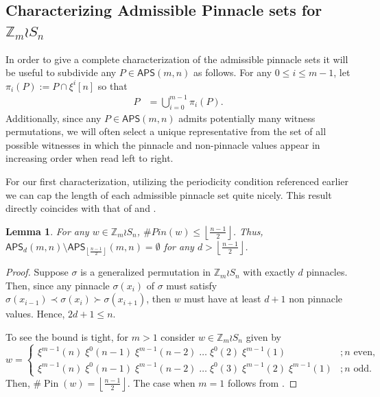 \documentclass[12pt,reqno]{amsart}
\numberwithin{equation}{section}
\theoremstyle{plain}
\newtheorem{lemma}[theorem]{Lemma}
\theoremstyle{definition}
\theoremstyle{remark}
\newcommand{\Z}{\mathbb{Z}}
\newcommand{\Pin}{\operatorname{Pin}}
\newcommand\APS{\mathsf{APS}}
\newcommand{\floor}[1]{\left\lfloor#1\right\rfloor}
\begin{document}
\subsection{Characterizing Admissible Pinnacle sets for $\Z_m\wr S_n$} \label{subsec:characterization}
In order to give a complete characterization of the admissible pinnacle sets it will be useful to subdivide any $P \in \APS(m,n)$ as follows. 
For any $0\leq i \leq m-1$, let $\pi_i(P) := P \cap \xi^i[n]$ so that 
\begin{align}
    P &=\bigcup_{i=0}^{m-1}\pi_i(P).
\end{align}
Additionally, since any $P \in \APS(m,n)$ admits potentially many witness permutations, we will often select a unique representative from the set of all possible witnesses in which the pinnacle and non-pinnacle values appear in increasing order when read left to right. 

\par For our first characterization, utilizing the periodicity condition referenced earlier we can cap the length of each admissible pinnacle set quite nicely. This result directly coincides with that of \cite{PinSignedPermutations} and \cite{PinnaclesTypeA}.


\begin{lemma} \label{lem:maxLength}
    For any $w \in \Z_m\wr S_n$, $\#Pin(w) \leq \floor{\frac{n-1}{2}}$. Thus, $\APS_d(m, n) \setminus \APS_{\floor{\frac{n-1}{2}}}(m, n) =\emptyset$ for any $d>\floor{\frac{n-1}{2}}$.
\end{lemma}

\begin{proof}
Suppose $\sigma$ is a generalized permutation in $\Z_m\wr S_n$ with exactly $d$ pinnacles. Then, since any pinnacle $\sigma(x_i)$ of $\sigma$ must satisfy $\sigma(x_{i-1}) \prec \sigma(x_i) \succ \sigma(x_{i+1})$, then $w$ must have at least $d+1$ non pinnacle values. Hence, $2d+1\leq n$. 

To see the bound is tight, for $m>1$ consider $w \in \Z_m \wr S_n$ given by
   \[
    w = \begin{cases}
    \xi^{m-1}(n)\; \xi^0(n-1)\; \xi^{m-1}(n-2)\; \dots\; \xi^{0}(2)\; \xi^{m-1}(1) &; n \text{ even,} \\
    \xi^{m-1}(n)\; \xi^0(n-1)\; \xi^{m-1}(n-2)\; \dots\;\xi^{0}(3) \;\xi^{m-1}(2)\; \xi^{m-1}(1) &; n \text{ odd. }
        \end{cases}
   \]
    Then, $\#\Pin(w) = \floor{\frac{n-1}{2}}$.
The case when $m=1$ follows from \cite[Lemma 2.1]{PinnaclesTypeA}.    
\end{proof}
\end{document}
